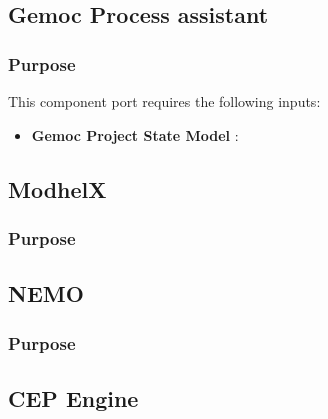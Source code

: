 \documentclass{gemoc} %
\begin{document}
\subsection{Gemoc Process assistant}


\subsubsection{Purpose}

This component port requires the following inputs:
\begin{itemize}
  \item \textbf{Gemoc Project State Model} :
\end{itemize}


\subsection{ModhelX}


\subsubsection{Purpose}



\subsection{NEMO}


\subsubsection{Purpose}



\subsection{CEP Engine}

\end{document}
